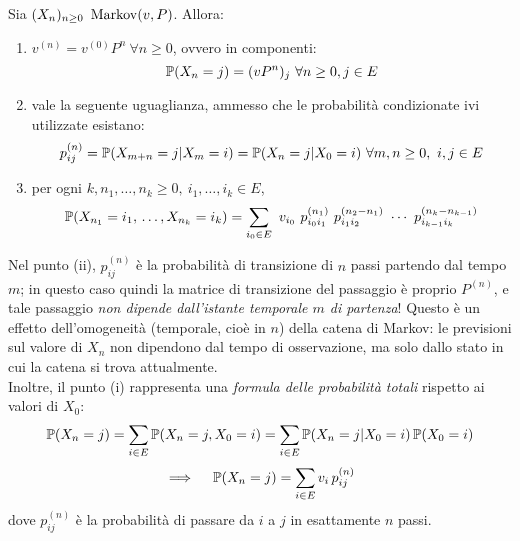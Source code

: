 \begin{teo}\label{teo-vettori-mark}
	Sia $(X_n)_{n \ge 0} \ \operatorname{Markov}(v,P)$.
	Allora:
	\begin{enumerate}[label=(\roman*)]
		\item $v^{(n)} = v^{(0)} P^n \ \forall n \ge 0$, ovvero in componenti:
		 	$$\mathbb P(X_n = j) = (v P^n)_j \ \forall n \ge 0, j \in E$$
		\item vale la seguente uguaglianza, ammesso che le probabilità condizionate ivi utilizzate esistano:
			$$p_{ij}^{(n)} = \mathbb P(X_{m+n} = j | X_m = i) = \mathbb P(X_n = j | X_0 = i) \ \forall m,n \ge 0, \ i,j \in E$$
		\item per ogni $k, n_1,\dots,n_k \ge 0, \ i_1,\dots,i_k \in E$,
		$$\mathbb P(X_{n_1}=i_1, \, \dots, X_{n_k}=i_k) = \sum_{i_0 \in E} \ v_{i_0} \ p_{i_0 i_1}^{(n_1)} \
		p_{i_1 i_2}^{(n_2-n_1)} \ \cdots \ p_{i_{k-1} i_k}^{(n_k - n_{k-1})}$$
	\end{enumerate}
\end{teo}

Nel punto (ii), $p_{ij}^{(n)}$ è la probabilità di transizione di $n$ passi partendo dal tempo $m$;
in questo caso quindi la matrice di transizione del passaggio è proprio $P^{(n)}$, e tale passaggio \emph{non dipende dall'istante temporale $m$ di partenza}!
Questo è un effetto dell'omogeneità (temporale, cioè in $n$) della catena di Markov: le previsioni sul valore di $X_n$ non dipendono dal tempo di osservazione, ma solo dallo stato in cui la catena si trova attualmente. \\
Inoltre, il punto (i) rappresenta una \emph{formula delle probabilità totali} rispetto ai valori di $X_0$:
$$\mathbb P(X_n=j) = \sum_{i \in E} \mathbb P(X_n=j, X_0=i) = \sum_{i \in E} \mathbb P(X_n=j | X_0=i) \, \mathbb P(X_0=i)$$
$$\implies \quad \mathbb P(X_n=j) = \sum_{i \in E} v_i \, p_{ij}^{(n)}$$
dove $p_{ij}^{(n)}$ è la probabilità di passare da $i$ a $j$ in esattamente $n$ passi.

